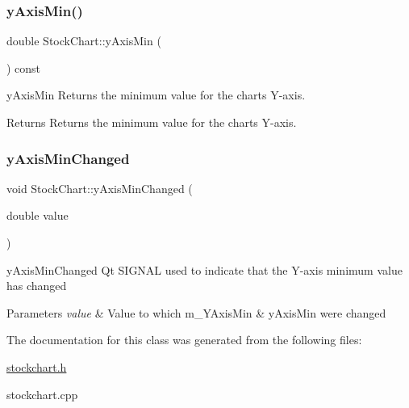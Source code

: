 \subsubsection{\texorpdfstring{y\+Axis\+Min()}{yAxisMin()}}
{\footnotesize\ttfamily double Stock\+Chart\+::y\+Axis\+Min (\begin{DoxyParamCaption}{ }\end{DoxyParamCaption}) const}



y\+Axis\+Min Returns the minimum value for the chart\textquotesingle{}s Y-\/axis. 

\begin{DoxyReturn}{Returns}
Returns the minimum value for the chart\textquotesingle{}s Y-\/axis. 
\end{DoxyReturn}
\mbox{\label{class_stock_chart_aefe9dfa0898e3f4daff97fe6cec674dc}} 
\subsubsection{\texorpdfstring{y\+Axis\+Min\+Changed}{yAxisMinChanged}}
{\footnotesize\ttfamily void Stock\+Chart\+::y\+Axis\+Min\+Changed (\begin{DoxyParamCaption}\item[{double}]{value }\end{DoxyParamCaption})\hspace{0.3cm}{\ttfamily [signal]}}



y\+Axis\+Min\+Changed Qt S\+I\+G\+N\+AL used to indicate that the Y-\/axis minimum value has changed 


\begin{DoxyParams}{Parameters}
{\em value} & Value to which m\+\_\+\+Y\+Axis\+Min \& y\+Axis\+Min were changed \\
\hline
\end{DoxyParams}


The documentation for this class was generated from the following files\+:\begin{DoxyCompactItemize}
\item 
\hyperlink{stockchart_8h}{stockchart.\+h}\item 
stockchart.\+cpp\end{DoxyCompactItemize}
